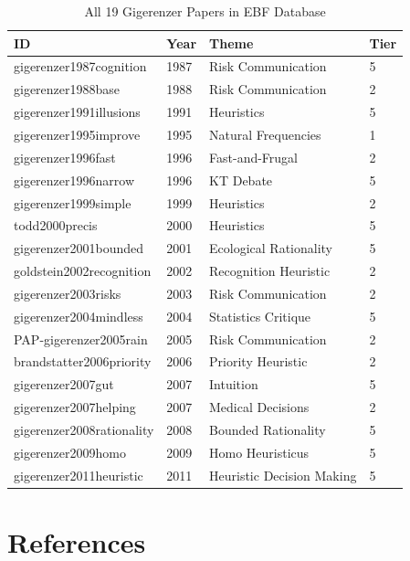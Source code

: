 \begin{table}[htbp]
\centering
\caption{All 19 Gigerenzer Papers in EBF Database}
\label{tab:gi-papers}
\renewcommand{\arraystretch}{1.2}
\scriptsize
\begin{tabular}{@{}llll@{}}
\toprule
\textbf{ID} & \textbf{Year} & \textbf{Theme} & \textbf{Tier} \\
\midrule
gigerenzer1987cognition & 1987 & Risk Communication & 5 \\
gigerenzer1988base & 1988 & Risk Communication & 2 \\
gigerenzer1991illusions & 1991 & Heuristics & 5 \\
gigerenzer1995improve & 1995 & Natural Frequencies & 1 \\
gigerenzer1996fast & 1996 & Fast-and-Frugal & 2 \\
gigerenzer1996narrow & 1996 & KT Debate & 5 \\
gigerenzer1999simple & 1999 & Heuristics & 2 \\
todd2000precis & 2000 & Heuristics & 5 \\
gigerenzer2001bounded & 2001 & Ecological Rationality & 5 \\
goldstein2002recognition & 2002 & Recognition Heuristic & 2 \\
gigerenzer2003risks & 2003 & Risk Communication & 2 \\
gigerenzer2004mindless & 2004 & Statistics Critique & 5 \\
PAP-gigerenzer2005rain & 2005 & Risk Communication & 2 \\
brandstatter2006priority & 2006 & Priority Heuristic & 2 \\
gigerenzer2007gut & 2007 & Intuition & 5 \\
gigerenzer2007helping & 2007 & Medical Decisions & 2 \\
gigerenzer2008rationality & 2008 & Bounded Rationality & 5 \\
gigerenzer2009homo & 2009 & Homo Heuristicus & 5 \\
gigerenzer2011heuristic & 2011 & Heuristic Decision Making & 5 \\
\bottomrule
\end{tabular}
\end{table}


\section{References}
\label{sec:gi-references}

